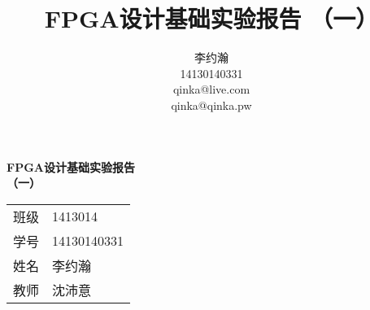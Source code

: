 \documentclass{ctexart}
\author{李约瀚 \\ 14130140331 \\ qinka@live.com \\ qinka@qinka.pw}
\title{FPGA设计基础实验报告 （一）}
\begin{document}
    
        \thispagestyle{empty}
        \begin{center}
            \vspace*{4em}
            {\Huge\textbf{FPGA设计基础实验报告\\\vspace*{0.5em} （一）}}
            \vfill
            \begin{tabular}{c@{：}l}
                班级 & 1413014 \\
                学号 & 14130140331 \\ 
                姓名 & 李约瀚 \\ 
                教师 & 沈沛意 \\
            \end{tabular} 
            \vspace*{4em}\\
        \end{center}
        \newpage
        
       
        
    
\end{document}

